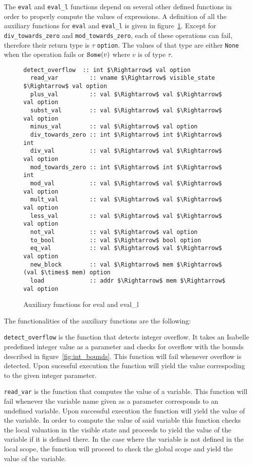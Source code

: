 The \verb|eval| and \verb|eval_l| functions depend on several other defined functions in order to properly compute the values of expressions.
A definition of all the auxiliary functions for \verb|eval| and \verb|eval_l| is given in figure~\ref{fig:aux_fun_eval}.
Except for \verb|div_towards_zero| and \verb|mod_towards_zero|, each of these operations can fail, therefore their return type is $\tau$ \verb|option|.
The values of that type are either \verb|None| when the operation fails or $\verb|Some|(v)$ where $v$ is of type $\tau$.

\begin{figure}
  \caption{Auxiliary functions for eval and eval\_l}
  \label{fig:aux_fun_eval}

  \begin{lstlisting}[mathescape=true, frame=single]
  detect_overflow  :: int $\Rightarrow$ val option
  read_var         :: vname $\Rightarrow$ visible_state $\Rightarrow$ val option
  plus_val         :: val $\Rightarrow$ val $\Rightarrow$ val option
  subst_val        :: val $\Rightarrow$ val $\Rightarrow$ val option
  minus_val        :: val $\Rightarrow$ val option
  div_towards_zero :: int $\Rightarrow$ int $\Rightarrow$ int
  div_val          :: val $\Rightarrow$ val $\Rightarrow$ val option
  mod_towards_zero :: int $\Rightarrow$ int $\Rightarrow$ int
  mod_val          :: val $\Rightarrow$ val $\Rightarrow$ val option
  mult_val         :: val $\Rightarrow$ val $\Rightarrow$ val option
  less_val         :: val $\Rightarrow$ val $\Rightarrow$ val option
  not_val          :: val $\Rightarrow$ val option
  to_bool          :: val $\Rightarrow$ bool option
  eq_val           :: val $\Rightarrow$ val $\Rightarrow$ val option
  new_block        :: val $\Rightarrow$ mem $\Rightarrow$ (val $\times$ mem) option
  load             :: addr $\Rightarrow$ mem $\Rightarrow$ val option
  \end{lstlisting}
\end{figure}

The functionalities of the auxiliary functions are the following:

\verb|detect_overflow| is the function that detects integer overflow.
It takes an Isabelle predefined integer value as a parameter and checks for overflow with the bounds described in figure~\ref{fig:int_bounds}.
This function will fail whenever overflow is detected.
Upon sucessful execution the function will yield the value correspoding to the given integer parameter.

\verb|read_var| is the function that computes the value of a variable.
This function will fail whenever the variable name given as a parameter corresponds to an undefined variable.
Upon successful execution the function will yield the value of the variable.
In order to compute the value of said variable this function checks the local valuation in the visible state and proceeds to yield the value of the variable if it is defined there.
In the case where the variable is not defined in the local scope, the function will proceed to check the global scope and yield the value of the variable.

